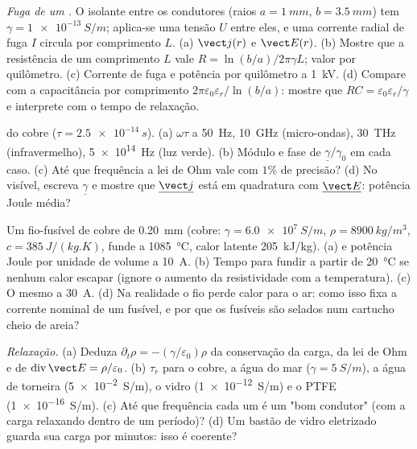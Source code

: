 \begin{exercise}[$\star\star$]\label{exo:b2:charges-currents-conduction:6}
\emph{Fuga de um .} O isolante entre os condutores
(raios $a = \qty{1}{mm}$, $b = \qty{3.5}{mm}$) tem $\gamma = \qty{1e-13}{S/m}$; aplica-se
uma tensão $U$ entre eles, e uma corrente radial de fuga $I$ circula
por comprimento $L$. (a) $\vect j(r)$ e $\vect E(r)$. (b) Mostre que a
resistência de um comprimento $L$ vale $R = \ln(b/a)/2\pi\gamma L$; valor por
quilômetro. (c) Corrente de fuga e potência por quilômetro a \qty{1}{kV}.
(d) Compare com a capacitância por comprimento $2\pi\varepsilon_0\varepsilon_r/\ln(b/a)$:
mostre que $RC = \varepsilon_0\varepsilon_r/\gamma$ e interprete com o tempo de relaxação.
\end{exercise}

\begin{exercise}[$\star\star$]\label{exo:b2:charges-currents-conduction:7}
 do cobre ($\tau = \qty{2.5e-14}{s}$). (a) $\omega\tau$ a
\qty{50}{Hz}, \qty{10}{GHz} (micro-ondas), \qty{30}{THz} (infravermelho), \qty{5e14}{Hz}
(luz verde). (b) Módulo e fase de $\underline\gamma/\gamma_0$ em cada caso.
(c) Até que frequência a lei de Ohm vale com $1\%$ de precisão? (d) No visível,
escreva $\underline\gamma$ e mostre que $\underline{\vect j}$ está em quadratura com
$\underline{\vect E}$: potência Joule média?
\end{exercise}

\begin{exercise}[$\star\star$]\label{exo:b2:charges-currents-conduction:8}
Um fio-fusível de cobre de \qty{0.20}{mm} (cobre: $\gamma = \qty{6.0e7}{S/m}$, $\rho =
\qty{8900}{kg/m^3}$, $c = \qty{385}{J/(kg.K)}$, funde a \qty{1085}{\degreeCelsius},
calor latente \qty{205}{kJ/kg}). (a)  e potência Joule por
unidade de volume a \qty{10}{A}. (b) Tempo para fundir a partir de \qty{20}{\degreeCelsius} se nenhum
calor escapar (ignore o aumento da resistividade com a temperatura). (c)
O mesmo a \qty{30}{A}. (d) Na realidade o fio perde calor para o ar: como
isso fixa a corrente nominal de um fusível, e por que os fusíveis são selados num
cartucho cheio de areia?
\end{exercise}

\begin{exercise}[$\star\star$]\label{exo:b2:charges-currents-conduction:9}
\emph{Relaxação.} (a) Deduza $\partial_t\rho = -(\gamma/\varepsilon_0)\rho$ da conservação
da carga, da lei de Ohm e de $\operatorname{div}\vect E = \rho/\varepsilon_0$. (b)
$\tau_r$ para o cobre, a água do mar ($\gamma = \qty{5}{S/m}$), a água de torneira
(\qty{5e-2}{S/m}), o vidro (\qty{1e-12}{S/m}) e o PTFE (\qty{1e-16}{S/m}). (c)
Até que frequência cada um é um "bom condutor" (com a carga relaxando dentro de
um período)? (d) Um bastão de vidro eletrizado guarda sua carga por minutos: isso é
coerente?
\end{exercise}

